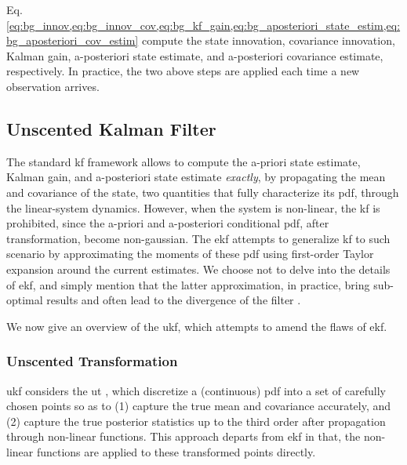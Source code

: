 Eq. \cref{eq:bg_innov,eq:bg_innov_cov,eq:bg_kf_gain,eq:bg_aposteriori_state_estim,eq:bg_aposteriori_cov_estim} compute the state innovation, covariance innovation, Kalman gain, a-posteriori state estimate, and a-posteriori covariance estimate, respectively.
In practice, the two above steps are applied each time a new observation arrives.

\subsection{Unscented Kalman Filter}
The standard \gls{kf} framework allows to compute the a-priori state estimate, Kalman gain, and a-posteriori state estimate \textit{exactly}, by propagating the mean and covariance of the state, two quantities that fully characterize its \gls{pdf}, through the linear-system dynamics.
However, when the system is non-linear, the \gls{kf} is prohibited, since the a-priori and a-posteriori conditional \gls{pdf}, after transformation, become non-gaussian.
The \gls{ekf} \cite{ribeiro04} attempts to generalize \gls{kf} to such scenario by approximating the moments of these \gls{pdf} using first-order Taylor expansion around the current estimates.
We choose not to delve into the details of \gls{ekf}, and simply mention that the latter approximation, in practice, bring sub-optimal results and often lead to the divergence of the filter \cite{wan00}.

We now give an overview of the \gls{ukf}, which attempts to amend the flaws of \gls{ekf}.

\subsubsection{Unscented Transformation}
\gls{ukf} considers the \gls{ut} \cite{julier96}, which discretize a (continuous) \gls{pdf} into a set of carefully chosen points so as to (1) capture the true mean and covariance accurately, and (2) capture the true posterior statistics up to the third order after propagation through non-linear functions.
This approach departs from \gls{ekf} in that, the non-linear functions are applied to these transformed points directly.

